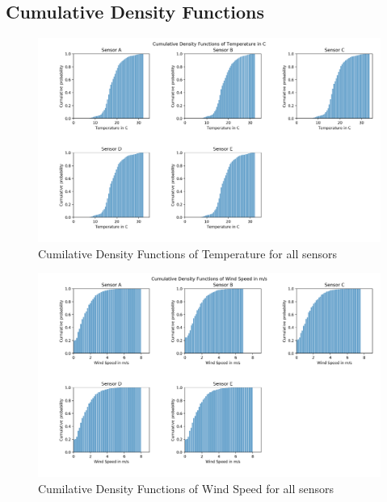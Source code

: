 \documentclass{article}
\begin{document}
    \subsection{Cumulative Density Functions}
        \begin{figure}
            \includegraphics[width=\textwidth]{cdf_temp}
            \caption{Cumilative Density Functions of Temperature for all sensors}
        \end{figure}

        \begin{figure}
            \includegraphics[width=\textwidth]{cdf_windspeed}
            \caption{Cumilative Density Functions of Wind Speed for all sensors}
        \end{figure}
\end{document}
